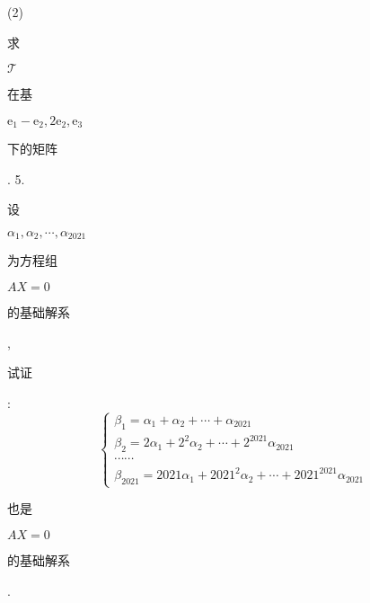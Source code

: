 \documentclass[10pt]{article}
\begin{document}
(2) \begin{CJK}{UTF8}{mj}求\end{CJK} $\mathscr{T}$ \begin{CJK}{UTF8}{mj}在基\end{CJK} $\mathrm{e}_{1}-\mathrm{e}_{2}, 2 \mathrm{e}_{2}, \mathrm{e}_{3}$ \begin{CJK}{UTF8}{mj}下的矩阵\end{CJK}. 5. \begin{CJK}{UTF8}{mj}设\end{CJK} $\alpha_{1}, \alpha_{2}, \cdots, \alpha_{2021}$ \begin{CJK}{UTF8}{mj}为方程组\end{CJK} $A X=0$ \begin{CJK}{UTF8}{mj}的基础解系\end{CJK}, \begin{CJK}{UTF8}{mj}试证\end{CJK}:
$$
\left\{\begin{array}{l}
\beta_{1}=\alpha_{1}+\alpha_{2}+\cdots+\alpha_{2021} \\
\beta_{2}=2 \alpha_{1}+2^{2} \alpha_{2}+\cdots+2^{2021} \alpha_{2021} \\
\cdots \cdots \\
\beta_{2021}=2021 \alpha_{1}+2021^{2} \alpha_{2}+\cdots+2021^{2021} \alpha_{2021}
\end{array}\right.
$$
\begin{CJK}{UTF8}{mj}也是\end{CJK} $A X=0$ \begin{CJK}{UTF8}{mj}的基础解系\end{CJK}.
\end{document}

